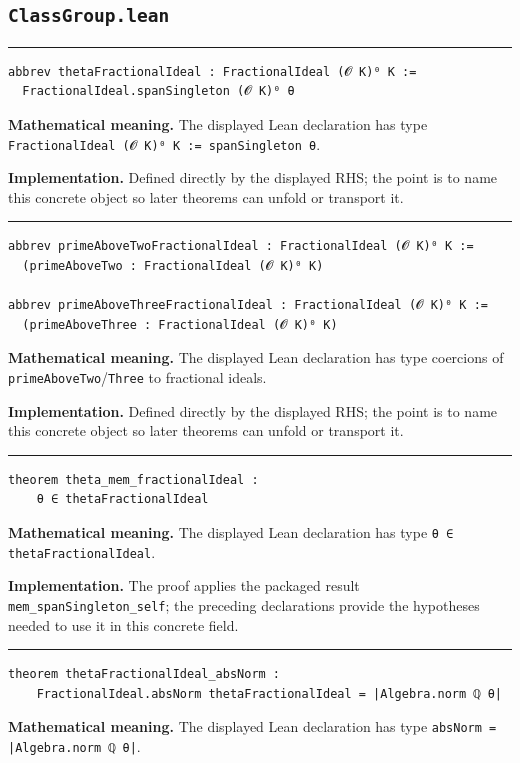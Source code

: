 \documentclass[UTF8,a4paper,11pt,fontset=fandol]{ctexart}
\theoremstyle{definition}
\newcommand{\statementsep}{\par\medskip\hrule\medskip}
\begin{document}
\subsection{\texttt{ClassGroup.lean}}

\statementsep
\begin{verbatim}
abbrev thetaFractionalIdeal : FractionalIdeal (𝓞 K)⁰ K :=
  FractionalIdeal.spanSingleton (𝓞 K)⁰ θ
\end{verbatim}
\noindent\textbf{Mathematical meaning.} The displayed Lean declaration has type \texttt{FractionalIdeal (𝓞 K)⁰ K := spanSingleton θ}.\par
\noindent\textbf{Implementation.} Defined directly by the displayed RHS; the point is to name this concrete object so later theorems can unfold or transport it.\par
\statementsep
\begin{verbatim}
abbrev primeAboveTwoFractionalIdeal : FractionalIdeal (𝓞 K)⁰ K :=
  (primeAboveTwo : FractionalIdeal (𝓞 K)⁰ K)

abbrev primeAboveThreeFractionalIdeal : FractionalIdeal (𝓞 K)⁰ K :=
  (primeAboveThree : FractionalIdeal (𝓞 K)⁰ K)
\end{verbatim}
\noindent\textbf{Mathematical meaning.} The displayed Lean declaration has type coercions of \texttt{primeAboveTwo}/\texttt{Three} to fractional ideals.\par
\noindent\textbf{Implementation.} Defined directly by the displayed RHS; the point is to name this concrete object so later theorems can unfold or transport it.\par
\statementsep
\begin{verbatim}
theorem theta_mem_fractionalIdeal :
    θ ∈ thetaFractionalIdeal
\end{verbatim}
\noindent\textbf{Mathematical meaning.} The displayed Lean declaration has type \texttt{θ ∈ thetaFractionalIdeal}.\par
\noindent\textbf{Implementation.} The proof applies the packaged result \texttt{mem\_\allowbreak{}spanSingleton\_\allowbreak{}self}; the preceding declarations provide the hypotheses needed to use it in this concrete field.\par
\statementsep
\begin{verbatim}
theorem thetaFractionalIdeal_absNorm :
    FractionalIdeal.absNorm thetaFractionalIdeal = |Algebra.norm ℚ θ|
\end{verbatim}
\noindent\textbf{Mathematical meaning.} The displayed Lean declaration has type \texttt{absNorm = |Algebra.\allowbreak{}norm ℚ θ|}.\par
\end{document}
